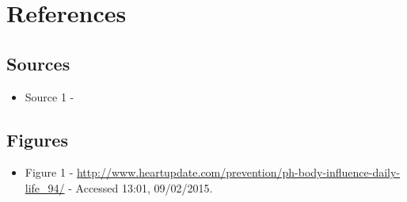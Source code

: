 \chapter{References}

\section{Sources}

\begin{itemize}
\item Source 1 - 
\end{itemize}

\section{Figures}
\begin{itemize}
\item Figure 1 - \url{http://www.heartupdate.com/prevention/ph-body-influence-daily-life_94/} - Accessed 13:01, 09/02/2015. 
\end{itemize}